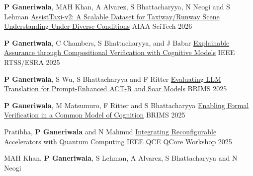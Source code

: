 \begin{cventries}
{}
\cventry
{\textbf{P Ganeriwala}, MAH Khan, A Alvarez, S Bhattacharyya, N Neogi and S Lehman}
{\href{https://arc.aiaa.org/doi/abs/10.2514/6.2026-1774}{AssistTaxi-v2: A Scalable Dataset for Taxiway/Runway Scene Understanding Under Diverse Conditions}}
{}
{AIAA SciTech 2026} 
{ %
\begin{cvitems}
\end{cvitems}
}
\cventry
{\textbf{P Ganeriwala}, C Chambers, S Bhattacharyya, and J Babar}
{\href{https://loonwerks.com/publications/ganeriwala2025ersa.html}{Explainable Assurance through Compositional Verification with Cognitive Models}}
{}
{IEEE RTSS/ESRA 2025} 
{ %
\begin{cvitems}
\end{cvitems}
}
\cventry
{\textbf{P Ganeriwala}, S Wu, S Bhattacharyya and F Ritter}
{
\href{https://sbp-brims.org/2025/papers/working-papers/2025_SBP-BRiMS_paper_26.pdf}{Evaluating LLM Translation for Prompt-Enhanced ACT-R and Soar Models}}
{}
{BRIMS 2025} 
{ %
\begin{cvitems}
\end{cvitems}
}
\cventry
{\textbf{P Ganeriwala}, M Matsumuro, F Ritter and S Bhattacharyya}
{
\href{https://sbp-brims.org/2025/papers/working-papers/2025_SBP-BRiMS_paper_18.pdf}{Enabling Formal Verification in a Common Model of Cognition}}
{}
{BRIMS 2025} 
{ %
\begin{cvitems}
\end{cvitems}
}
\cventry
{Pratibha, \textbf{P Ganeriwala} and N Mahmud}
{\href{https://ieeexplore.ieee.org/document/11249949}{Integrating Reconfigurable Accelerators with Quantum Computing}}
{}
{IEEE QCE QCore Workshop 2025} 
{ %
\begin{cvitems}
\end{cvitems}
}
\cventry
{MAH Khan, \textbf{P Ganeriwala}, S Lehman, A Alvarez, S Bhattacharyya and N Neogi}
{\href{https://openaccess.thecvf.com/content/ICCV2025W/2COOOL/html/Khan_Adapt_But_Dont_Forget_Fine-Tuning_and_Contrastive_Routing_for_Lane_ICCVW_2025_paper.html}{%
}}
\end{cventries}
